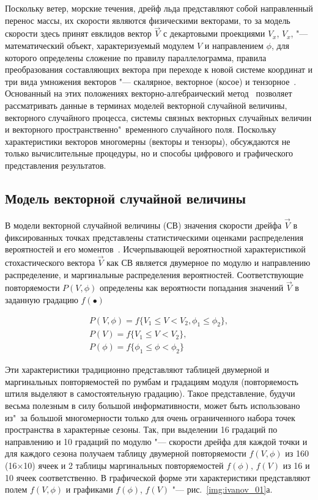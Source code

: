 Поскольку ветер, морские течения, дрейф льда представляют собой направленный перенос массы, их скорости являются физическими векторами, то за модель скорости здесь принят евклидов вектор $\vec{V}$ с декартовыми проекциями  $V_x$, $V_x$, "--- математический объект, характеризуемый модулем $V$ и направлением $\phi$, для которого определены сложение по правилу параллелограмма, правила преобразования составляющих вектора при переходе к новой системе координат и три вида умножения векторов "--- скалярное, векторное (косое) и тензорное~\cite{Kochin2013}. Основанный на этих положениях  векторно-алгебраический метод~\cite{Belyshev1983} позволяет рассматривать данные в терминах моделей векторной случайной величины, векторного случайного процесса, системы связных векторных случайных величин и векторного пространственно"~временного случайного поля. Поскольку характеристики векторов многомерны (векторы и тензоры), обсуждаются не только вычислительные процедуры, но и способы цифрового и графического представления результатов.

\subsection{Модель векторной случайной величины}
В модели векторной случайной величины (СВ) значения скорости дрейфа $\vec{V}$ в фиксированных точках представлены статистическими оценками распределения вероятностей и его моментов~\cite{Belyshev1983,Klevancov1996}. Исчерпывающей вероятностной характеристикой стохастического вектора $\vec{V}$ как СВ является двумерное по модулю и направлению распределение, и маргинальные распределения вероятностей. Соответствующие повторяемости $P(V,\phi)$ определены как вероятности попадания значений $\vec{V}$ в заданную градацию $f(\bullet)$ 

\begin{equation}
\label{eq:equation3_1}
 \begin{alignedat}{2}
  P(V,\phi) = f\{V_1\le V<V_2, \phi_1\le\phi_2\},\\
  P(V) = f\{V_1\le V<V_2\},\\
  P(\phi) = f\{\phi_1\le \phi<\phi_2\} 
 \end{alignedat}
\end{equation}

Эти характеристики традиционно представляют таблицей двумерной и маргинальных повторяемостей по румбам и градациям модуля (повторяемость штиля выделяют в самостоятельную градацию). Такое представление, будучи весьма полезным в силу большой информативности, может быть использовано из"~за большой многомерности только для очень ограниченного набора точек пространства в характерные сезоны. Так, при выделении 16 градаций по направлению и 10 градаций по модулю "---  скорости дрейфа для каждой точки и для каждого сезона получаем таблицу двумерной повторяемости $f(V,\phi)$ из 160 (16$\times$10) ячеек и 2 таблицы маргинальных повторяемостей $f(\phi)$, $f(V)$ из 16 и 10 ячеек соответственно. В графической форме эти характеристики представляют полем $f(V,\phi)$ и графиками $f(\phi)$, $f(V)$ "--- рис.~\ref{img:ivanov_01}а.


